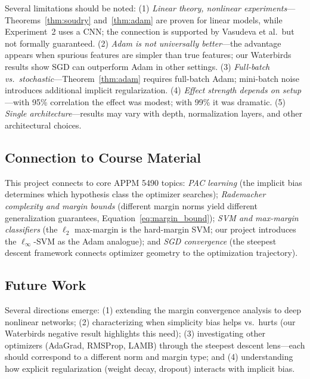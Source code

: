 \documentclass{article}
\begin{document}
Several limitations should be noted: (1) \emph{Linear theory, nonlinear experiments}---Theorems~\ref{thm:soudry} and~\ref{thm:adam} are proven for linear models, while Experiment~2 uses a CNN; the connection is supported by Vasudeva et al.\ but not formally guaranteed. (2) \emph{Adam is not universally better}---the advantage appears when spurious features are simpler than true features; our Waterbirds results show SGD can outperform Adam in other settings. (3) \emph{Full-batch vs.\ stochastic}---Theorem~\ref{thm:adam} requires full-batch Adam; mini-batch noise introduces additional implicit regularization. (4) \emph{Effect strength depends on setup}---with 95\% correlation the effect was modest; with 99\% it was dramatic. (5) \emph{Single architecture}---results may vary with depth, normalization layers, and other architectural choices.

\subsection{Connection to Course Material}

This project connects to core APPM 5490 topics: \emph{PAC learning} (the implicit bias determines which hypothesis class the optimizer searches); \emph{Rademacher complexity and margin bounds} (different margin norms yield different generalization guarantees, Equation~\ref{eq:margin_bound}); \emph{SVM and max-margin classifiers} (the $\ell_2$ max-margin is the hard-margin SVM; our project introduces the $\ell_\infty$-SVM as the Adam analogue); and \emph{SGD convergence} (the steepest descent framework connects optimizer geometry to the optimization trajectory).

\subsection{Future Work}

Several directions emerge: (1) extending the margin convergence analysis to deep nonlinear networks; (2) characterizing when simplicity bias helps vs.\ hurts (our Waterbirds negative result highlights this need); (3) investigating other optimizers (AdaGrad, RMSProp, LAMB) through the steepest descent lens---each should correspond to a different norm and margin type; and (4) understanding how explicit regularization (weight decay, dropout) interacts with implicit bias.
\end{document}
